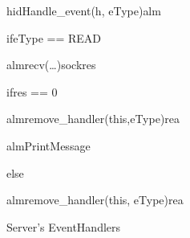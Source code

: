 \documentclass[Main]{subfiles}
\begin{document}
\newpage
\begin{figure}[htbp]
\begin {sequencediagram}

	\begin{messcall}{hid}{Handle\_event(h, eType)}{alm}

		\begin{sdblock}{if}{eType == READ}
			\begin{call}{alm}{recv(\dots)}{sock}{res}
			\end{call}

			\begin{sdblock}{if}{res == 0}
				\begin{messcall}{alm}{remove\_handler(this,eType)}{rea}
				\end{messcall}


			\end{sdblock}

			\begin{callself}{alm}{PrintMessage}{}
			\end{callself}
		\end{sdblock}

		\begin{sdblock}{else}{}
			\begin{call}{alm}{remove\_handler(this, eType)}{rea}{}
			\end{call}
		\end{sdblock}

	\end{messcall}



\end{sequencediagram}

\caption{Server's EventHandlers}
\label{fig:SererEventHandler}
\end{figure}
\end{document}
